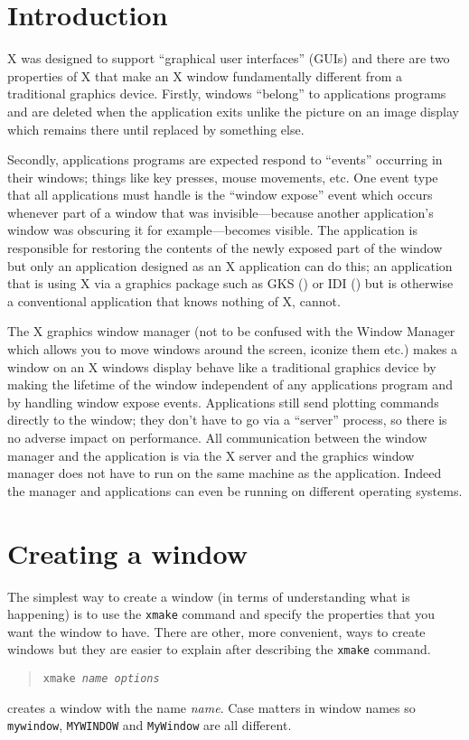 \documentclass[twoside,11pt,nolof]{starlink}
\begin{document}
\scfrontmatter

\section{Introduction}

X was designed to support ``graphical user interfaces'' (GUIs) and there are two
properties of X that make an X window fundamentally different from a
traditional graphics device.
Firstly, windows ``belong'' to applications programs and are deleted when the
application exits unlike the picture on an image display which remains there
until replaced by something else.

Secondly, applications
programs are expected respond to ``events'' occurring in their windows;
things like key presses, mouse movements, etc. One event type that all
applications must handle is the ``window expose'' event which occurs whenever
part of a window that was invisible---because another application's window was
obscuring it for example---becomes visible. The application is responsible for
restoring the contents of the newly exposed part of the window but only an
application designed as an X application can do this; an application that is
using X via a graphics package such as GKS ()
or IDI () but is otherwise a
conventional application that knows nothing of X, cannot.

The X graphics window manager (not to be confused with the Window
Manager which allows you to move windows around the screen, iconize them etc.)
makes a window on an X windows display behave like a
traditional graphics device by making the lifetime of the window independent
of any applications program and by handling window expose events. Applications
still send plotting commands directly to the window; they don't have to go via
a ``server'' process, so there is no adverse impact on performance. All
communication between the window manager and the application is via the X
server and the graphics window manager does not have to run on the same
machine as the application.
Indeed the manager and applications can even be running on different operating
systems.

\section{Creating a window}

The simplest way to create a window (in terms of understanding what is
happening) is to use the \texttt{xmake} command and specify the properties that
you want the window to have. There are other, more convenient, ways to create
windows but they are easier to explain after describing the \texttt{xmake} command.
\begin{quote}\texttt{xmake \emph{name} \emph{options}}
\end{quote}
creates a window with the name \emph{name}. Case matters in window names so \texttt{mywindow}, \texttt{MYWINDOW} and \texttt{MyWindow} are all different.
\end{document}

